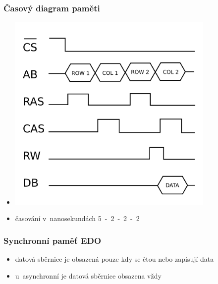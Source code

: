 \documentclass[a4paper,12pt]{article}
\providecommand{\tightlist}{%
\setlength{\itemsep}{0pt}\setlength{\parskip}{0pt}}
\begin{document}
\subsubsection{Časový diagram paměti}

\begin{itemize}
\tightlist
\item[] \includegraphics[width=10cm]{ref/casovy-diagram-dynamicke-pameti.png}
\item časování v~nanosekundách 5~-~2~-~2~-~2
\end{itemize}

\subsubsection{Synchronní paměť EDO}

\begin{itemize}
\tightlist
\item datová sběrnice je obsazená pouze kdy se čtou nebo zapisují data
\item u~asynchronní je datová sběrnice obsazena vždy
\end{itemize}
\end{document}
